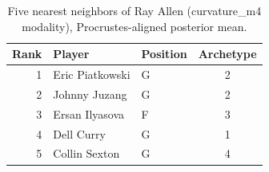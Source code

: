 \begin{table}[htbp]
  \centering\small
  \begin{tabular}{rllc}
    \toprule
    Rank & Player & Position & Archetype \\
    \midrule
    1 & Eric Piatkowski & G & 2 \\
    2 & Johnny Juzang & G & 2 \\
    3 & Ersan Ilyasova & F & 3 \\
    4 & Dell Curry & G & 1 \\
    5 & Collin Sexton & G & 4 \\
    \bottomrule
  \end{tabular}
  \caption{Five nearest neighbors of Ray Allen (curvature_m4 modality), Procrustes-aligned posterior mean.}
  \label{tab:Ray_Allen_neighbors_curvature_m4}
\end{table}

